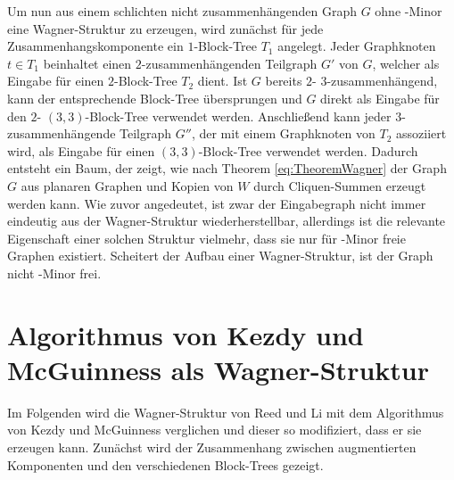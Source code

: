 Um nun aus einem schlichten nicht zusammenhängenden Graph $G$ ohne \kf-Minor eine Wagner-Struktur zu erzeugen, wird zunächst für jede Zusammenhangskomponente ein $1$-Block-Tree $T_1$ angelegt.
Jeder Graphknoten $t \in T_1$ beinhaltet einen $2$-zusammenhängenden Teilgraph $G'$ von $G$, welcher als Eingabe für einen $2$-Block-Tree $T_2$ dient.
Ist $G$ bereits $2$- \bzw $3$-zusammenhängend, kann der entsprechende Block-Tree übersprungen und $G$ direkt als Eingabe für den $2$- \bzw $(3, 3)$-Block-Tree verwendet werden.
Anschließend kann jeder $3$-zusammenhängende Teilgraph $G''$, der mit einem Graphknoten von $T_2$ assoziiert wird, als Eingabe für einen $(3, 3)$-Block-Tree verwendet werden.
Dadurch entsteht ein Baum, der zeigt, wie nach Theorem \ref{eq:TheoremWagner} der Graph $G$ aus planaren Graphen und Kopien von $W$ durch Cliquen-Summen erzeugt werden kann.
Wie zuvor angedeutet, ist zwar der Eingabegraph nicht immer eindeutig aus der Wagner-Struktur wiederherstellbar, allerdings ist die relevante Eigenschaft einer solchen Struktur vielmehr, dass sie nur für \kf-Minor freie Graphen existiert.
Scheitert der Aufbau einer Wagner-Struktur, ist der Graph nicht \kf-Minor frei.


\section{Algorithmus von Kezdy und McGuinness als Wagner-Struktur}
Im Folgenden wird die Wagner-Struktur von Reed und Li mit dem Algorithmus von Kezdy und McGuinness verglichen und dieser so modifiziert, dass er sie erzeugen kann.
Zunächst wird der Zusammenhang zwischen augmentierten Komponenten und den verschiedenen Block-Trees gezeigt.

